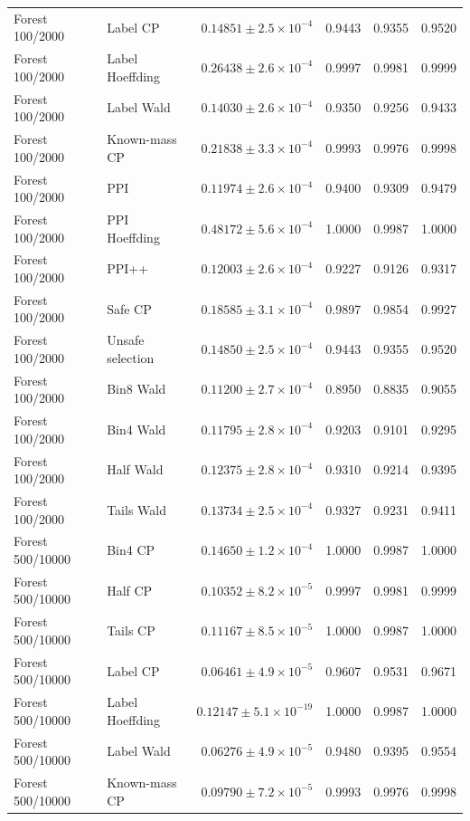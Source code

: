 \begin{longtable}{llrrrr}
Forest 100/2000 & Label CP & $0.14851\pm 2.5\times 10^{-4}$ & 0.9443 & 0.9355 & 0.9520 \\
Forest 100/2000 & Label Hoeffding & $0.26438\pm 2.6\times 10^{-4}$ & 0.9997 & 0.9981 & 0.9999 \\
Forest 100/2000 & Label Wald & $0.14030\pm 2.6\times 10^{-4}$ & 0.9350 & 0.9256 & 0.9433 \\
Forest 100/2000 & Known-mass CP & $0.21838\pm 3.3\times 10^{-4}$ & 0.9993 & 0.9976 & 0.9998 \\
Forest 100/2000 & PPI & $0.11974\pm 2.6\times 10^{-4}$ & 0.9400 & 0.9309 & 0.9479 \\
Forest 100/2000 & PPI Hoeffding & $0.48172\pm 5.6\times 10^{-4}$ & 1.0000 & 0.9987 & 1.0000 \\
Forest 100/2000 & PPI++ & $0.12003\pm 2.6\times 10^{-4}$ & 0.9227 & 0.9126 & 0.9317 \\
Forest 100/2000 & Safe CP & $0.18585\pm 3.1\times 10^{-4}$ & 0.9897 & 0.9854 & 0.9927 \\
Forest 100/2000 & Unsafe selection & $0.14850\pm 2.5\times 10^{-4}$ & 0.9443 & 0.9355 & 0.9520 \\
Forest 100/2000 & Bin8 Wald & $0.11200\pm 2.7\times 10^{-4}$ & 0.8950 & 0.8835 & 0.9055 \\
Forest 100/2000 & Bin4 Wald & $0.11795\pm 2.8\times 10^{-4}$ & 0.9203 & 0.9101 & 0.9295 \\
Forest 100/2000 & Half Wald & $0.12375\pm 2.8\times 10^{-4}$ & 0.9310 & 0.9214 & 0.9395 \\
Forest 100/2000 & Tails Wald & $0.13734\pm 2.5\times 10^{-4}$ & 0.9327 & 0.9231 & 0.9411 \\
Forest 500/10000 & Bin4 CP & $0.14650\pm 1.2\times 10^{-4}$ & 1.0000 & 0.9987 & 1.0000 \\
Forest 500/10000 & Half CP & $0.10352\pm 8.2\times 10^{-5}$ & 0.9997 & 0.9981 & 0.9999 \\
Forest 500/10000 & Tails CP & $0.11167\pm 8.5\times 10^{-5}$ & 1.0000 & 0.9987 & 1.0000 \\
Forest 500/10000 & Label CP & $0.06461\pm 4.9\times 10^{-5}$ & 0.9607 & 0.9531 & 0.9671 \\
Forest 500/10000 & Label Hoeffding & $0.12147\pm 5.1\times 10^{-19}$ & 1.0000 & 0.9987 & 1.0000 \\
Forest 500/10000 & Label Wald & $0.06276\pm 4.9\times 10^{-5}$ & 0.9480 & 0.9395 & 0.9554 \\
Forest 500/10000 & Known-mass CP & $0.09790\pm 7.2\times 10^{-5}$ & 0.9993 & 0.9976 & 0.9998 \\

\end{longtable}
